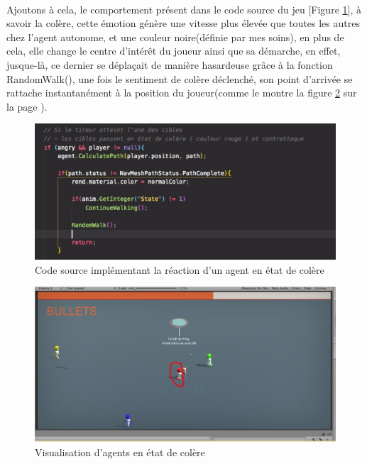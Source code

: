 ~\par
Ajoutons à cela, le comportement présent dans le code source du jeu [Figure \ref{fig:derfon}], à savoir la colère, cette émotion génère une vitesse plus élevée que toutes les autres chez l’agent autonome, et une couleur noire(définie par mes soins), en plus de cela, elle change le centre d'intérêt du joueur ainsi que sa démarche, en effet, jusque-là, ce dernier se déplaçait de manière hasardeuse grâce à la fonction RandomWalk(), une fois le sentiment de colère déclenché, son point d’arrivée se rattache instantanément à la position du joueur(comme le montre la figure \ref{fig:bichi4} sur la page \pageref{fig:bichi4}).



\begin{figure}[th]
\centering
\includegraphics{Figures/derfon.JPG}
\decoRule
\caption[Code source implémentant la réaction d'un agent en état de colère]{Code source implémentant la réaction d'un agent en état de colère}
\label{fig:derfon}
\end{figure}



\begin{figure}[th]
\centering
\includegraphics{Figures/rouge.JPG}
\decoRule
\caption[Visualisation d'agents en état de colère]{Visualisation d'agents en état de colère}
\label{fig:bichi4}
\end{figure}

